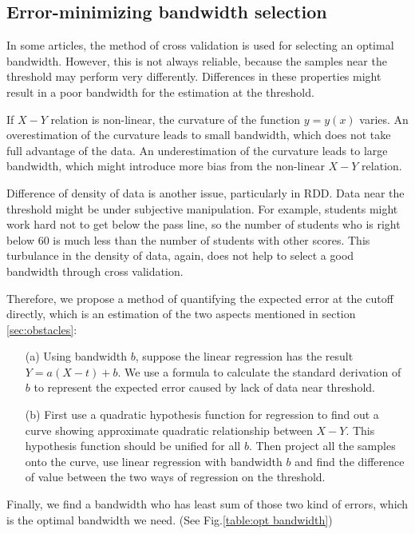 \documentclass[a4 paper,12pt]{article}
\begin{document}
\subsection{Error-minimizing bandwidth selection}

In some articles, the method of cross validation is used for selecting an optimal bandwidth.
However, this is not always reliable,
because the samples near the threshold may perform very differently.
Differences in these properties might result in a poor bandwidth for the estimation at the threshold.

If $X-Y$ relation is non-linear,
the curvature of the function $y=y(x)$ varies.
An overestimation of the curvature leads to small bandwidth,
which does not take full advantage of the data.
An underestimation of the curvature leads to large bandwidth,
which might introduce more bias from the non-linear $X-Y$ relation.

Difference of density of data is another issue, particularly in RDD.
Data near the threshold might be under subjective manipulation.
For example, students might work hard not to get below the pass line,
so the number of students who is right below $60$ is much less than the number of students with other scores.
This turbulance in the density of data, again, does not help to select a good bandwidth through cross validation.

Therefore, we propose a method of quantifying the expected error at the cutoff directly, which is an estimation of the two aspects mentioned in section \ref{sec:obstacles}:

\begin{enumerate}
   \item[(a)] Using bandwidth $b$, suppose the linear regression has the result $Y=a(X-t)+b$. We use a formula to calculate the standard derivation of $b$ to represent the expected error caused by lack of data near threshold.
   \item[(b)] First use a quadratic hypothesis function for regression to find out a curve showing approximate quadratic relationship between $X-Y$. This hypothesis function should be unified for all $b$. Then project all the samples onto the curve, use linear regression with bandwidth $b$ and find the difference of value between the two ways of regression on the threshold.
\end{enumerate}

Finally, we find a bandwidth who has least sum of those two kind of errors, which is the optimal bandwidth we need. (See Fig.\ref{table:opt bandwidth})
\end{document}

